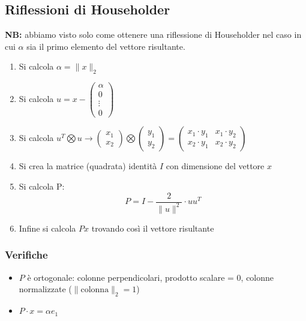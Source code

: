 \documentclass[10pt]{article}
\begin{document}
\subsection{Riflessioni di Householder}
\textbf{NB:} abbiamo visto solo come ottenere una riflessione di Householder nel caso in cui $\alpha$ sia il primo elemento del vettore risultante.
\begin{enumerate}
    \item Si calcola $\alpha=\lVert x\rVert_{2}$
    \item Si calcola $u=x-\begin{pmatrix}
        \alpha \\ 0 \\ \vdots \\ 0
    \end{pmatrix}$
    \item Si calcola $u^{T}\bigotimes u \rightarrow \begin{pmatrix}
        x_{1} \\ x_{2}
    \end{pmatrix}\bigotimes\begin{pmatrix}
        y_{1} \\ y_{2}
    \end{pmatrix}=\begin{pmatrix}
        x_{1}\cdot y_{1} & x_{1}\cdot y_{2} \\
        x_{2}\cdot y_{1} & x_{2}\cdot y_{2}
    \end{pmatrix}$
    \item Si crea la matrice (quadrata) identità $I$ con dimensione del vettore $x$ 
    \item Si calcola P: \begin{equation*}
        P = I-\frac{2}{\lVert u\rVert^{2}}\cdot uu^{T}
    \end{equation*}
    \item Infine si calcola $Px$ trovando così il vettore risultante
\end{enumerate}
\subsubsection{Verifiche}
\begin{itemize}
    \item $P$ è ortogonale: colonne perpendicolari, prodotto scalare = 0, colonne normalizzate ($\lVert\text{colonna}\rVert_{2}=1$)
    \item $P\cdot x = \alpha e_{1}$
\end{itemize}
\end{document}
